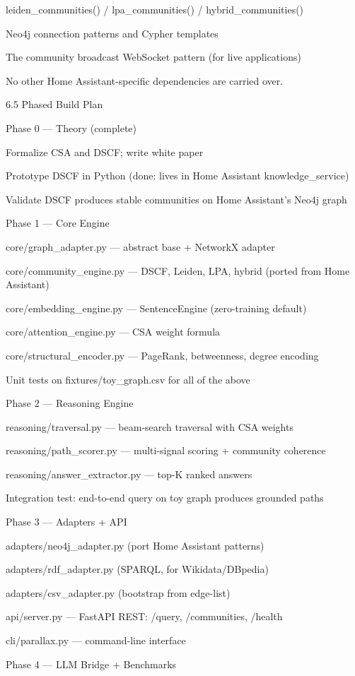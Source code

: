 \documentclass[10pt,journal,compsoc]{IEEEtran}
\begin{document}
leiden\_communities() / lpa\_communities() / hybrid\_communities()

Neo4j connection patterns and Cypher templates

The community broadcast WebSocket pattern (for live appli\-cations)

No other Home Assistant-specific depen\-dencies are carried over.

6.5 Phased Build Plan

Phase 0 — Theory (complete)

Formalize CSA and DSCF; write white paper

Prototype DSCF in Python (done: lives in Home Assistant knowledge\_service)

Validate DSCF produces stable communities on Home Assistant's Neo4j graph

Phase 1 — Core Engine

core/graph\_adapter.py — abstract base + NetworkX adapter

core/community\_engine.py — DSCF, Leiden, LPA, hybrid (ported from Home Assistant)

core/embedding\_engine.py — SentenceEngine (zero-training default)

core/attention\_engine.py — CSA weight formula

core/structural\_encoder.py — PageRank, betweenness, degree encoding

Unit tests on fixtures/toy\_graph.csv for all of the above

Phase 2 — Reasoning Engine

reasoning/traversal.py — beam-search traversal with CSA weights

reasoning/path\_scorer.py — multi-signal scoring + community coherence

reasoning/answer\_extractor.py — top-K ranked answers

Integration test: end-to-end query on toy graph produces grounded paths

Phase 3 — Adapters + API

adapters/neo4j\_adapter.py (port Home Assistant patterns)

adapters/rdf\_adapter.py (SPARQL, for Wikidata/DBpedia)

adapters/csv\_adapter.py (bootstrap from edge-list)

api/server.py — FastAPI REST: /query, /communities, /health

cli/parallax.py — command-line interface

Phase 4 — LLM Bridge + Benchmarks
\end{document}
